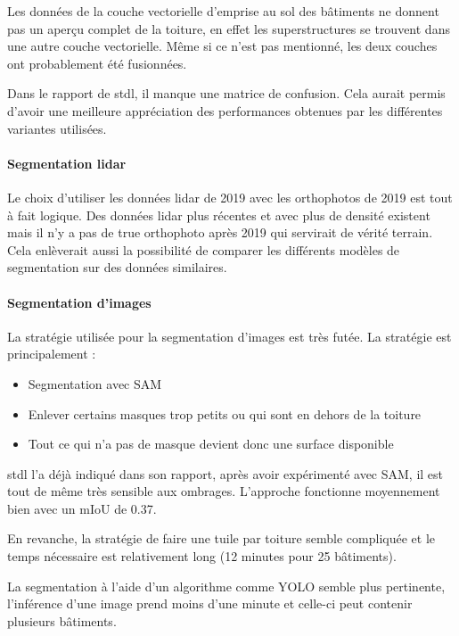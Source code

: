 {{{{Les données de la couche vectorielle d'emprise au sol des bâtiments ne donnent pas un aperçu complet de la toiture, en effet les superstructures se trouvent dans une autre couche vectorielle. Même si ce n'est pas mentionné, les deux couches ont probablement été fusionnées.

Dans le rapport de \acrshort{stdl}, il manque une matrice de confusion. Cela aurait permis d'avoir une meilleure appréciation des performances obtenues par les différentes variantes utilisées.

\paragraph{Segmentation \gls{lidar}}

Le choix d'utiliser les données \gls{lidar} de 2019 avec les orthophotos de 2019 est tout à fait logique. Des données \gls{lidar} plus récentes et avec plus de densité existent mais il n'y a pas de true orthophoto après 2019 qui servirait de vérité terrain. Cela enlèverait aussi la possibilité de comparer les différents modèles de segmentation sur des données similaires.

\paragraph{Segmentation d'images}

La stratégie utilisée pour la segmentation d'images est très futée. La stratégie est principalement :
\begin{itemize}
\item Segmentation avec SAM
\item Enlever certains masques trop petits ou qui sont en dehors de la toiture
\item Tout ce qui n'a pas de masque devient donc une surface disponible
\end{itemize}

\acrshort{stdl} l'a déjà indiqué dans son rapport, après avoir expérimenté avec SAM, il est tout de même très sensible aux ombrages. L'approche fonctionne moyennement bien avec un mIoU de 0.37.

En revanche, la stratégie de faire une tuile par toiture semble compliquée et le temps nécessaire est relativement long (12 minutes pour 25 bâtiments).

La segmentation à l'aide d'un algorithme comme YOLO semble plus pertinente, l'inférence d'une image prend moins d'une minute et celle-ci peut contenir plusieurs bâtiments.

}}}}
